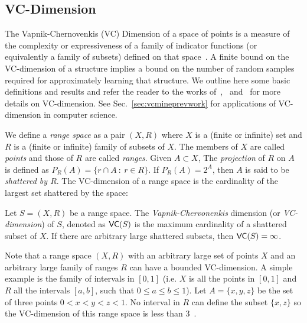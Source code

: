 \subsection{VC-Dimension}\label{sec:vcmineprelvcdim}
The Vapnik-Chernovenkis (VC) Dimension of a space of points is a measure of the
complexity or expressiveness of a family of indicator functions (or equivalently
a family of subsets) defined on that space~\citep{VapnikC71}. A finite bound on
the VC-dimension of a structure implies a bound on the number of random samples
required for approximately learning that structure. We outline here some basic
definitions and results and refer the reader to the works
of~\citet[Sec.~14.4]{AlonS08},~\citet{DevroyeGL96} and~\citet{Vapnik99} for more details
on VC-dimension. See Sec.~\ref{sec:vcmineprevwork} for applications of VC-dimension in 
computer science.

%
We define a {\em range space} as a pair $(X,R)$ where $X$ is a (finite or infinite) set
 and $R$ is a (finite or infinite) family of subsets of $X$. The members of $X$
 are called {\em points} and those of $R$ are called {\em ranges}.
Given $A\subset X$, The {\em projection} of $R$ on
$A$ is defined as $P_R(A)=\{r\cap A ~:~ r\in R\}$.
%
If $P_R(A)=2^A$, then $A$ is said to be {\em shattered by $R$}.
The VC-dimension of a range space is the cardinality of the largest set
shattered by the space:
\begin{definition}\label{defn:VCdim}
  Let $S=(X,R)$ be a range space. The {\em Vapnik-Chervonenkis} dimension (or
  {\em VC-dimension}) of $S$, denoted as $\mathsf{VC}(S)$ is the maximum cardinality of
  a shattered subset of $X$. If there are arbitrary large shattered subsets,
  then $\mathsf{VC}(S)=\infty$.
\end{definition}

Note that a range space $(X,R)$ with an arbitrary large set of points $X$ and
an arbitrary large family of ranges $R$ can have a bounded VC-dimension. A simple
example is the family of intervals in $[0,1]$ (i.e. $X$ is all the points in
$[0,1]$ and $R$ all the intervals $[a,b]$, such that $0\leq a\leq b\leq 1$). Let
$A=\{x,y,z\}$ be the set of three points $0<x<y<z<1$. No interval in $R$ can
define the subset $\{x,z\}$ so the VC-dimension of this range space is less than
3~\cite[Lemma 10.3.1]{Matousek02}.

